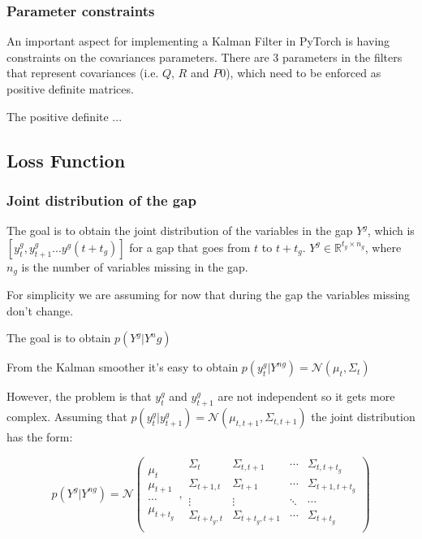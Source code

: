 \documentclass{article}
\let\Oldsubsection\subsection
\renewcommand{\subsection}{\FloatBarrier\Oldsubsection}
\let\Oldsubsubsection\subsubsection
\renewcommand{\subsubsection}{\FloatBarrier\Oldsubsubsection}
\begin{document}
\subsubsection{Parameter constraints}

An important aspect for implementing a Kalman Filter in PyTorch is having constraints on the covariances parameters. There are 3 parameters in the filters that represent covariances (i.e. $Q$, $R$ and $P0$), which need to be enforced as positive definite matrices.

The positive definite ...



\subsection{Loss Function}

\subsubsection{Joint distribution of the gap}

The goal is to obtain the joint distribution of the variables in the gap $Y^g$, which is $[y^g_t, y^g_{t+1} ... y^g(t+t_g)]$
for a gap that goes from $t$ to $t+t_g$. $Y^g \in \mathbb{R}^{t_g \times n_g}$, where $n_g$ is the number of variables missing in the gap.

For simplicity we are assuming for now that during the gap the variables missing don't change.

The goal is to obtain $p(Y^g|Y^ng)$

From the Kalman smoother it's easy to obtain $p(y^g_t|Y^{ng}) = \mathcal{N}(\mu_{t}, \Sigma_{t})$

However, the problem is that $y^g_t$ and $y^g_{t+1}$ are not independent so it gets more complex.
Assuming that $p(y^g_t|y^g_{t+1}) = \mathcal{N}(\mu_{t,t+1}, \Sigma_{t,t+1})$ the joint distribution has the form:

$$ p(Y^g|Y^{ng}) = \mathcal{N}\left(\begin{array}{c}
     \mu_{t}   \\
     \mu_{t+1} \\
     \cdots    \\
     \mu_{t+t_g}
\end{array},
\begin{array}{cccc}
    \Sigma_{t}       & \Sigma_{t,t+1}     & \cdots & \Sigma_{t,t+t_g}   \\
    \Sigma_{t+1,t}   & \Sigma_{t+1}       & \cdots & \Sigma_{t+1,t+t_g} \\
    \vdots           & \vdots             & \ddots & \cdots             \\ 
    \Sigma_{t+t_g,t} & \Sigma_{t+t_g,t+1} & \cdots & \Sigma_{t+t_g}     \\
\end{array}\right)$$
\end{document}
